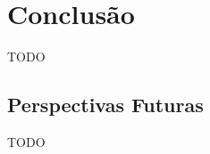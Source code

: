 \chapter{Conclus\~ao}\label{cap:conclusao}

TODO






\section{Perspectivas Futuras}\label{sec:perspectivasFuturas}

TODO

